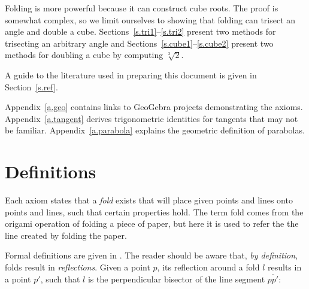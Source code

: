 Folding is more powerful because it can construct cube roots. The proof is somewhat complex, so we limit ourselves to showing that folding can trisect an angle and double a cube. Sections~\ref{s.tri1}--\ref{s.tri2} present two methods for trisecting an arbitrary angle and  Sections~\ref{s.cube1}--\ref{s.cube2} present two methods for doubling a cube by computing $\sqrt[3]{2}$.

A guide to the literature used in preparing this document is given in Section~\ref{s.ref}.

Appendix~\ref{a.geo} contains links to GeoGebra projects demonstrating the axioms.
Appendix~\ref{a.tangent} derives trigonometric identities for tangents that may not be familiar. Appendix~\ref{a.parabola} explains the geometric definition of parabolas.



\section{Definitions}

Each axiom states that a \emph{fold} exists that will place given points and lines onto points and lines, such that certain properties hold. The term fold comes from the origami operation of folding a piece of paper, but here it is used to refer the the line created by folding the paper.

Formal definitions are given in \cite[Chapter~10]{martin}. The reader should be aware that, \emph{by definition}, folds result in \emph{reflections}. Given a point $p$, its reflection around a fold $l$ results in a point $p'$, such that $l$ is the perpendicular bisector of the line segment $\overline{pp'}$:


\begin{center}
\end{center}
